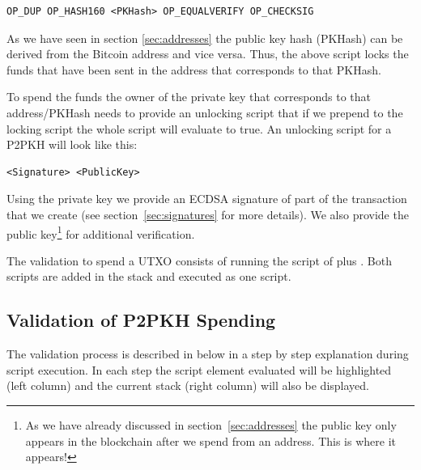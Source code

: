 \begin{emphbox}
\begin{verbatim}
OP_DUP OP_HASH160 <PKHash> OP_EQUALVERIFY OP_CHECKSIG
\end{verbatim}
\end{emphbox}

As we have seen in section \ref{sec:addresses} the public key hash (PKHash) can be derived from the Bitcoin address and vice versa. Thus, the above script locks the funds that have been sent in the address that corresponds to that PKHash.

To spend the funds the owner of the private key that corresponds to that address/PKHash needs to provide an unlocking script that if we prepend to the locking script the whole script will evaluate to true. An unlocking script for a P2PKH will look like this:

\begin{emphbox}
\begin{verbatim}
<Signature> <PublicKey>
\end{verbatim}
\end{emphbox}

Using the private key we provide an ECDSA signature of part of the transaction that we create (see section~\ref{sec:signatures} for more details). We also provide the public key\footnote{As we have already discussed in section~\ref{sec:addresses} the public key only appears in the blockchain after we spend from an address. This is where it appears!} for additional verification.

The validation to spend a UTXO consists of running the script of  plus . Both scripts are added in the stack and executed as one script.

\subsection*{Validation of P2PKH Spending}
The validation process is described in below in a step by step explanation during script execution. In each step the script element evaluated will be highlighted (left column) and the current stack (right column) will also be displayed.

